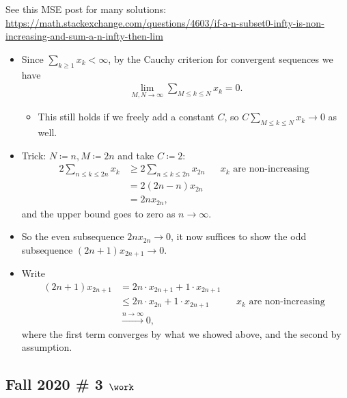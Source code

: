 \begin{solution}

See this MSE post for many solutions:
\url{https://math.stackexchange.com/questions/4603/if-a-n-subset0-infty-is-non-increasing-and-sum-a-n-infty-then-lim}

\begin{itemize}
\item
  Since \(\sum_{k\geq 1}x_k < \infty\), by the Cauchy criterion for
  convergent sequences we have
  \begin{align*}
  \lim_{M, N\to \infty} \sum_{M\leq k \leq N} x_k = 0
  .\end{align*}

  \begin{itemize}
  \tightlist
  \item
    This still holds if we freely add a constant \(C\), so
    \(C\sum_{M\leq k \leq N} x_k \to 0\) as well.
  \end{itemize}
\item
  Trick: \(N \coloneqq n, M \coloneqq 2n\) and take \(C\coloneqq 2\):
  \begin{align*}
  2\sum_{n\leq k \leq 2n} x_k
  &\geq 2\sum_{n\leq k \leq 2n} x_{2n} && \text{$x_k$ are non-increasing }\\
  &= 2 (2n-n)x_{2n} \\
  &= 2nx_{2n}
  ,\end{align*}
  and the upper bound goes to zero as \(n\to \infty\).
\item
  So the even subsequence \(2n x_{2n} \to 0\), it now suffices to show
  the odd subsequence \((2n+1) x_{2n+1} \to 0\).
\item
  Write
  \begin{align*}
  (2n+1)x_{2n+1} 
  &= 2n\cdot x_{2n+1} + 1\cdot x_{2n+1} \\
  &\leq 2n\cdot x_{2n} + 1\cdot x_{2n+1} &&\text{$x_k$ are non-increasing }\\
  &\overset{n\to \infty}\longrightarrow 0
  ,\end{align*}
  where the first term converges by what we showed above, and the second
  by assumption.
\end{itemize}

\end{solution}

\hypertarget{fall-2020-3-work}{%
\subsection{\texorpdfstring{Fall 2020 \# 3
\(\work\)}{Fall 2020 \# 3 \textbackslash work}}\label{fall-2020-3-work}}

